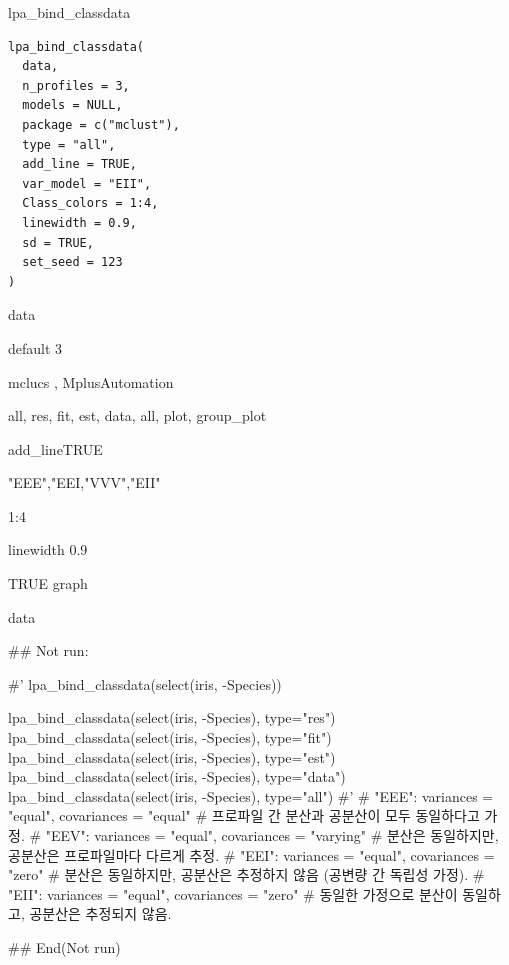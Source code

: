 \documentclass[a4paper]{book}
\begin{document}
%
\begin{Description}
lpa\_bind\_classdata
\end{Description}
%
\begin{Usage}
\begin{verbatim}
lpa_bind_classdata(
  data,
  n_profiles = 3,
  models = NULL,
  package = c("mclust"),
  type = "all",
  add_line = TRUE,
  var_model = "EII",
  Class_colors = 1:4,
  linewidth = 0.9,
  sd = TRUE,
  set_seed = 123
)
\end{verbatim}
\end{Usage}
%
\begin{Arguments}
\begin{ldescription}
\item[\code{data}] data

\item[\code{n\_profiles}] default 3

\item[\code{package}] mclucs , MplusAutomation

\item[\code{type}] all, res, fit, est, data, all, plot, group\_plot

\item[\code{add\_line}] add\_lineTRUE

\item[\code{var\_model}] "EEE","EEI,"VVV","EII"

\item[\code{Class\_colors}] 1:4

\item[\code{linewidth}] linewidth 0.9

\item[\code{sd}] TRUE graph
\end{ldescription}
\end{Arguments}
%
\begin{Value}
data
\end{Value}
%
\begin{Examples}
\begin{ExampleCode}

\#\# Not run: 

#'
lpa_bind_classdata(select(iris, -Species))

lpa_bind_classdata(select(iris, -Species), type="res")
lpa_bind_classdata(select(iris, -Species), type="fit")
lpa_bind_classdata(select(iris, -Species), type="est")
lpa_bind_classdata(select(iris, -Species), type="data")%
lpa_bind_classdata(select(iris, -Species), type="all")
#'
# "EEE": variances = "equal", covariances = "equal"
# 프로파일 간 분산과 공분산이 모두 동일하다고 가정.
# "EEV": variances = "equal", covariances = "varying"
# 분산은 동일하지만, 공분산은 프로파일마다 다르게 추정.
# "EEI": variances = "equal", covariances = "zero"
# 분산은 동일하지만, 공분산은 추정하지 않음 (공변량 간 독립성 가정).
# "EII": variances = "equal", covariances = "zero"
# 동일한 가정으로 분산이 동일하고, 공분산은 추정되지 않음.

## End(Not run)



\end{ExampleCode}
\end{Examples}
\end{document}
